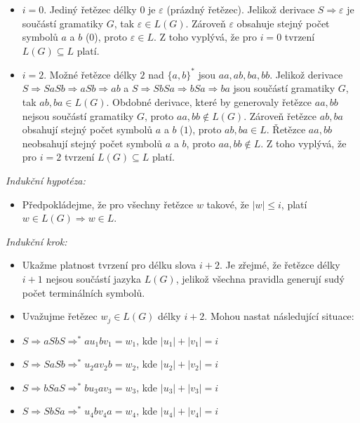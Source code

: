 \documentclass[11pt, a4paper, titlepage]{article}
\begin{document}
\begin{itemize}
    \item $i = 0$. Jediný řetězec délky $0$ je $\varepsilon$ (prázdný řetězec). Jelikož derivace $S \Rightarrow \varepsilon$ je součástí gramatiky $G$, tak $\varepsilon \in L(G)$. Zároveň $\varepsilon$ obsahuje stejný počet symbolů $a$ a $b$ ($0$), proto $\varepsilon \in L$. Z toho vyplývá, že pro $i = 0$ tvrzení $L(G) \subseteq L$ platí.

    \item $i = 2$. Možné řetězce délky $2$ nad $\{ a, b \}^*$ jsou $aa, ab, ba, bb$. Jelikož derivace $S \Rightarrow SaSb \Rightarrow aSb \Rightarrow ab$ a $S \Rightarrow SbSa \Rightarrow bSa \Rightarrow ba$ jsou součástí gramatiky $G$, tak $ab, ba \in L(G)$. Obdobné derivace, které by generovaly řetězce $aa, bb$ nejsou součástí gramatiky $G$, proto $aa, bb \notin L(G)$. Zároveň řetězce $ab, ba$ obsahují stejný počet symbolů $a$ a $b$ ($1$), proto $ab, ba \in L$. Řetězce $aa, bb$ neobsahují stejný počet symbolů $a$ a $b$, proto $aa, bb \notin L$. Z toho vyplývá, že pro $i = 2$ tvrzení $L(G) \subseteq L$ platí.
\end{itemize}

\medskip
\textit{Indukční hypotéza:}

\begin{itemize}
    \item Předpokládejme, že pro všechny řetězce $w$ takové, že $|w| \leq i$, platí $w \in L(G) \Rightarrow w \in L$.
\end{itemize}

\medskip
\textit{Indukční krok:}

\begin{itemize}
    \item Ukažme platnost tvrzení pro délku slova $i+2$. Je zřejmé, že řetězce délky $i+1$ nejsou součástí jazyka $L(G)$, jelikož všechna pravidla generují sudý počet terminálních symbolů.

    \item Uvažujme řetězec $w_j \in L(G)$ délky $i+2$. Mohou nastat následující situace:
\end{itemize}

\begin{itemize}[leftmargin=2cm, label=$\circ$]
    \item $S \Rightarrow aSbS \Rightarrow^* a u_1 b v_1 = w_1$, kde $|u_1| + |v_1| = i$
    \item $S \Rightarrow SaSb \Rightarrow^* u_2 a v_2 b  = w_2$, kde $|u_2| + |v_2| = i$
    \item $S \Rightarrow bSaS \Rightarrow^* b u_3 a v_3 = w_3$, kde $|u_3| + |v_3| = i$
    \item $S \Rightarrow SbSa \Rightarrow^* u_4 b v_4 a = w_4$, kde $|u_4| + |v_4| = i$
\end{itemize}
\end{document}
